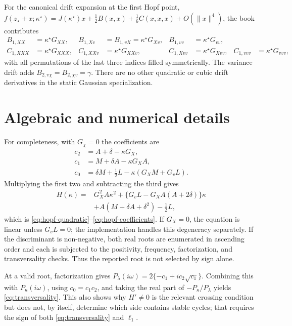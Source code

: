 \documentclass[11pt]{article}
\begin{document}
For the canonical drift expansion at the first Hopf point,
$f(z_\star+x;\kappa^\star)=J(\kappa^\star)x+\tfrac12B(x,x)
+\tfrac16C(x,x,x)+O(\|x\|^4)$,
the book contributes
\begin{align*}
B_{1,XX}&=\kappa^\star G_{XX},&
B_{1,Xv}&=B_{1,vX}=\kappa^\star G_{Xv},&
B_{1,vv}&=\kappa^\star G_{vv},\\
C_{1,XXX}&=\kappa^\star G_{XXX},&
C_{1,XXv}&=\kappa^\star G_{XXv},&
C_{1,Xvv}&=\kappa^\star G_{Xvv},&
C_{1,vvv}&=\kappa^\star G_{vvv},
\end{align*}
with all permutations of the last three indices filled symmetrically.  The variance drift
adds $B_{2,v\chi}=B_{2,\chi v}=\gamma$.  There are no other quadratic or cubic drift
derivatives in the static Gaussian specialization.

\section{Algebraic and numerical details}
\label{app:numerics}

For completeness, with $G_\chi=0$ the coefficients are
\begin{align*}
c_2&=A+\delta-\kappa G_X,\\
c_1&=M+\delta A-\kappa G_XA,\\
c_0&=\delta M+\tfrac12L-\kappa(G_XM+G_vL).
\end{align*}
Multiplying the first two and subtracting the third gives
\begin{align*}
H(\kappa)
={}&G_X^2A\kappa^2
+\{G_vL-G_XA(A+2\delta)\}\kappa\\
&+A(M+\delta A+\delta^2)-\tfrac12L,
\end{align*}
which is \eqref{eq:hopf-quadratic}--\eqref{eq:hopf-coefficients}.  If $G_X=0$, the equation is linear unless
$G_vL=0$; the implementation handles this degeneracy separately.  If the discriminant is
non-negative, both real roots are enumerated in ascending order and each is subjected to
the positivity, frequency, factorization, and transversality checks.  Thus the reported
root is not selected by sign alone.

At a valid root, factorization gives
$P_\lambda(i\omega)=2\{-c_1+i c_2\sqrt{c_1}\}$.  Combining this with
$P_\kappa(i\omega)$, using $c_0=c_1c_2$, and taking the real part of
$-P_\kappa/P_\lambda$ yields \eqref{eq:transversality}.  This also shows why
$H'\neq0$ is the relevant crossing condition but does not, by itself, determine which side
contains stable cycles; that requires the sign of both \eqref{eq:transversality} and
$\ell_1$.
\end{document}
